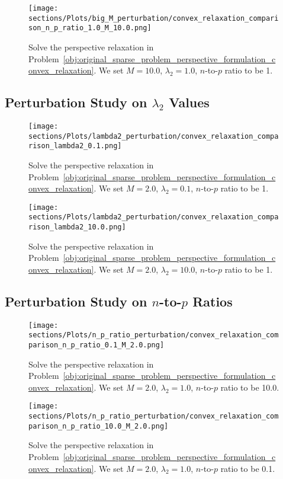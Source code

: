 \begin{figure*}
    \texttt{[image: sections/Plots/big\_M\_perturbation/convex\_relaxation\_comparison\_n\_p\_ratio\_1.0\_M\_10.0.png]}
    \caption{Solve the perspective relaxation in Problem~\eqref{obj:original_sparse_problem_perspective_formulation_convex_relaxation}.
    We set $M=10.0$, $\lambda_2=1.0$, $n$-to-$p$ ratio to be 1.}
    \label{fig:solve_convex_relaxation_M_10.0_lambda2_1.0_n_p_ratio_1.0}
\end{figure*}

\clearpage
\subsection{Perturbation Study on $\lambda_2$ Values}


\begin{figure*}[h]
    \texttt{[image: sections/Plots/lambda2\_perturbation/convex\_relaxation\_comparison\_lambda2\_0.1.png]}
    \caption{Solve the perspective relaxation in Problem~\eqref{obj:original_sparse_problem_perspective_formulation_convex_relaxation}.
    We set $M=2.0$, $\lambda_2=0.1$, $n$-to-$p$ ratio to be 1.}
    \label{fig:solve_convex_relaxation_M_2.0_lambda2_0.1_n_p_ratio_1.0}
\end{figure*}

\begin{figure*}[h]
    \texttt{[image: sections/Plots/lambda2\_perturbation/convex\_relaxation\_comparison\_lambda2\_10.0.png]}
    \caption{Solve the perspective relaxation in Problem~\eqref{obj:original_sparse_problem_perspective_formulation_convex_relaxation}.
    We set $M=2.0$, $\lambda_2=10.0$, $n$-to-$p$ ratio to be 1.}
    \label{fig:solve_convex_relaxation_M_2.0_lambda2_10.0_n_p_ratio_1.0}
\end{figure*}

\clearpage
\subsection{Perturbation Study on $n$-to-$p$ Ratios}


\begin{figure*}[h]
    \texttt{[image: sections/Plots/n\_p\_ratio\_perturbation/convex\_relaxation\_comparison\_n\_p\_ratio\_0.1\_M\_2.0.png]}
    \caption{Solve the perspective relaxation in Problem~\eqref{obj:original_sparse_problem_perspective_formulation_convex_relaxation}.
    We set $M=2.0$, $\lambda_2=1.0$, $n$-to-$p$ ratio to be 10.0.}
    \label{fig:solve_convex_relaxation_M_2.0_lambda2_1.0_n_p_ratio_10.0}
\end{figure*}


\begin{figure*}[h]
    \texttt{[image: sections/Plots/n\_p\_ratio\_perturbation/convex\_relaxation\_comparison\_n\_p\_ratio\_10.0\_M\_2.0.png]}
    \caption{Solve the perspective relaxation in Problem~\eqref{obj:original_sparse_problem_perspective_formulation_convex_relaxation}.
    We set $M=2.0$, $\lambda_2=1.0$, $n$-to-$p$ ratio to be 0.1.}
    \label{fig:solve_convex_relaxation_M_2.0_lambda2_1.0_n_p_ratio_0.1}
\end{figure*}